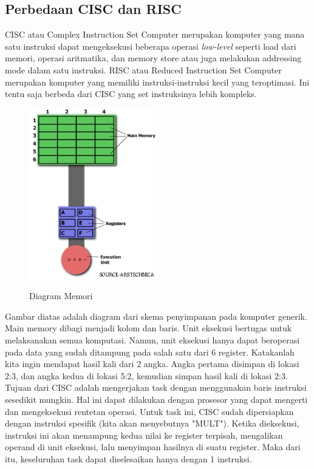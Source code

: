 \documentclass[a4paper,12pt]{article}
\begin{document}
\subsection{Perbedaan CISC dan RISC}
CISC atau Complex Instruction Set Computer merupakan komputer yang mana satu instruksi dapat mengeksekusi beberapa operasi \textit{low-level} seperti load dari memori, operasi aritmatika, dan memory store atau juga melakukan addressing mode dalam satu instruksi. RISC atau Reduced Instruction Set Computer merupakan komputer yang memiliki instruksi-instruksi kecil yang teroptimasi. Ini tentu saja berbeda dari CISC yang set instruksinya lebih kompleks. 

\begin{figure}[H]
\centering
\includegraphics[width=0.5\textwidth]{memoryfig.png}\\
\caption{Diagram Memori}
\end{figure}

Gambar diatas adalah diagram dari skema penyimpanan pada komputer generik. Main memory dibagi menjadi kolom dan baris. Unit eksekusi bertugas untuk melaksanakan semua komputasi. Namun, unit eksekusi hanya dapat beroperasi pada data yang sudah ditampung pada salah satu dari 6 register. Katakanlah kita ingin mendapat hasil kali dari 2 angka. Angka pertama disimpan di lokasi 2:3, dan angka kedua di lokasi 5:2, kemudian simpan hasil kali di lokasi 2:3. Tujuan dari CISC adalah mengerjakan task dengan menggunakan baris instruksi sesedikit mungkin. Hal ini dapat dilakukan dengan prosesor yang dapat mengerti dan mengeksekusi rentetan operasi. Untuk task ini, CISC sudah dipersiapkan dengan instruksi spesifik (kita akan menyebutnya "MULT"). Ketika dieksekusi, instruksi ini akan menampung kedua nilai ke register terpisah, mengalikan operand di unit eksekusi, lalu menyimpan hasilnya di suatu register. Maka dari itu, keseluruhan task dapat diselesaikan hanya dengan 1 instruksi.
\end{document}
